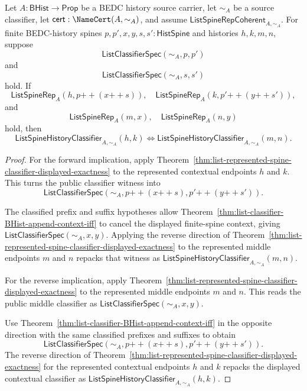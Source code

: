 \begin{theorem}
\label{thm:list-represented-spine-append-context-cancellation}
Let $A:\mathsf{BHist}\to\mathsf{Prop}$ be a BEDC history source carrier, let
$\sim_A$ be a source classifier, let $\mathsf{cert}:\NameCert(A,\sim_A)$, and
assume $\mathsf{ListSpineRepCoherent}_{A,\sim_A}$. For finite BEDC-history
spines $p,p',x,y,s,s':\mathsf{HistSpine}$ and histories $h,k,m,n$, suppose
$$
\mathsf{ListClassifierSpec}(\sim_A,p,p')
$$
and
$$
\mathsf{ListClassifierSpec}(\sim_A,s,s')
$$
hold. If
$$
\mathsf{ListSpineRep}_A(h,p{++}(x{++}s)),
\quad
\mathsf{ListSpineRep}_A(k,p'{++}(y{++}s')),
$$
and
$$
\mathsf{ListSpineRep}_A(m,x),
\quad
\mathsf{ListSpineRep}_A(n,y)
$$
hold, then
$$
\mathsf{ListSpineHistoryClassifier}_{A,\sim_A}(h,k)
\Longleftrightarrow
\mathsf{ListSpineHistoryClassifier}_{A,\sim_A}(m,n).
$$
\end{theorem}
\begin{proof}
For the forward implication, apply
Theorem~\ref{thm:list-represented-spine-classifier-displayed-exactness} to the
represented contextual endpoints $h$ and $k$. This turns the public classifier
witness into
$$
\mathsf{ListClassifierSpec}(\sim_A,p{++}(x{++}s),p'{++}(y{++}s')).
$$

The classified prefix and suffix hypotheses allow
Theorem~\ref{thm:list-classifier-BHist-append-context-iff} to cancel the displayed
finite-spine context, giving $\mathsf{ListClassifierSpec}(\sim_A,x,y)$. Applying
the reverse direction of
Theorem~\ref{thm:list-represented-spine-classifier-displayed-exactness} to the
represented middle endpoints $m$ and $n$ repacks that witness as
$\mathsf{ListSpineHistoryClassifier}_{A,\sim_A}(m,n)$.

For the reverse implication, apply
Theorem~\ref{thm:list-represented-spine-classifier-displayed-exactness} to the
represented middle endpoints $m$ and $n$. This reads the public middle
classifier as $\mathsf{ListClassifierSpec}(\sim_A,x,y)$.

Use Theorem~\ref{thm:list-classifier-BHist-append-context-iff} in the opposite
direction with the same classified prefixes and suffixes to obtain
$$
\mathsf{ListClassifierSpec}(\sim_A,p{++}(x{++}s),p'{++}(y{++}s')).
$$
The reverse direction of
Theorem~\ref{thm:list-represented-spine-classifier-displayed-exactness} for the
represented contextual endpoints $h$ and $k$ repacks the displayed contextual
classifier as $\mathsf{ListSpineHistoryClassifier}_{A,\sim_A}(h,k)$.
\end{proof}

